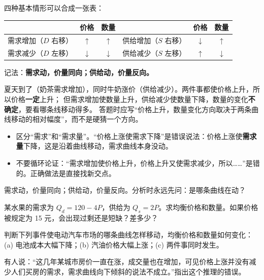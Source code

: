 \noindent\begin{minipage}{\linewidth}
\setlength{\parskip}{.35\baselineskip}
四种基本情形可以合成一张表：
\begin{center}
\small
\begin{tabular}{lcc|lcc}
  \toprule
  & 价格 & 数量 & & 价格 & 数量 \\
  \midrule
  需求增加（$D$ 右移） & $\uparrow$ & $\uparrow$ & 供给增加（$S$ 右移） & $\downarrow$ & $\uparrow$ \\
  需求减少（$D$ 左移） & $\downarrow$ & $\downarrow$ & 供给减少（$S$ 左移） & $\uparrow$ & $\downarrow$ \\
  \bottomrule
\end{tabular}
\end{center}
记法：\textbf{需求动，价量同向；供给动，价量反向。}
\end{minipage}

\begin{example}[两条线同时动]
夏天到了（奶茶需求增加），同时牛奶涨价（供给减少）。两件事都使价格上升，所以价格\textbf{一定}上升；
但需求增加使数量上升，供给减少使数量下降，数量的变化\textbf{不确定}，要看哪条线移动得多。
答题时应写“价格上升，数量变化方向取决于两条曲线移动的相对幅度”，而不是硬猜一个方向。
\end{example}

\begin{pitfall}
\begin{itemize}
  \item 区分“需求”和“需求量”。“价格上涨使需求下降”是错误说法：价格上涨使\textbf{需求量}下降，这是沿着曲线移动，需求曲线本身没动。
  \item 不要循环论证：“需求增加使价格上升，价格上升又使需求减少，所以……”是错的。正确做法是直接找新交点。
\end{itemize}
\end{pitfall}

\begin{oneline}
需求动，价量同向；供给动，价量反向。分析时永远先问：是哪条曲线在动？
\end{oneline}

\begin{exercises}[练一练]
  \item 某水果的需求为 $Q_d=120-4P$，供给为 $Q_s=2P$。求均衡价格和数量。如果价格被规定为 15 元，会出现过剩还是短缺？差多少？
  \item 判断下列事件使电动汽车市场的哪条曲线怎样移动，均衡价格和数量如何变化：
        (a) 电池成本大幅下降；(b) 汽油价格大幅上涨；(c) 两件事同时发生。
  \item 有人说：“这几年某城市房价一直在涨，成交量也在增加，可见价格上涨并没有减少人们买房的需求，需求曲线向下倾斜的说法不成立。”指出这个推理的错误。
\end{exercises}
